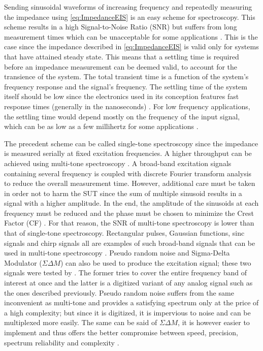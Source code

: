 Sending sinusoidal waveforms of increasing frequency and repeatedly measuring the impedance using \autoref{eq:ImpedanceEIS} is an easy scheme for spectroscopy. This scheme results in a high Signal-to-Noise Ratio (SNR) \cite{leHuy2004circuits} but suffers from long measurement times which can be unacceptable for some applications \cite{Grossi2017,Kargupta2018,Rajabzadeh2019EIS}. This is the case since the impedance described in \ref{eq:ImpedanceEIS} is valid only for systems that have attained steady state. This means that a settling time is required before an impedance measurement can be deemed valid, to account for the transience of the system. The total transient time is a function of the system’s frequency response and the signal’s frequency. The settling time of the system itself should be low since the electronics used in its conception features fast response times (generally in the nanoseconds) \cite{horowitz1989art}. For low frequency applications, the settling time would depend mostly on the frequency of the input signal, which can be as low as a few millihertz for some applications \cite{Grossi2017}. \par

The precedent scheme can be called single-tone spectroscopy since the impedance is measured serially at fixed excitation frequencies. A higher throughput can be achieved using multi-tone spectroscopy \cite{horowitz1989art,Rajabzadeh2019Signals}. A broad-band excitation signals containing several frequency is coupled with discrete Fourier transform analysis to reduce the overall measurement time. However, additional care must be taken in order not to harm the SUT since the sum of multiple sinusoid results in a signal with a higher amplitude. In the end, the amplitude of the sinusoids at each frequency must be reduced and the phase must be chosen to minimize the Crest Factor (CF) \cite{landon1936study}. For that reason, the SNR of multi-tone spectroscopy is lower than that of single-tone spectroscopy. Rectangular pulses, Gaussian functions, sinc signals and chirp signals all are examples of such broad-band signals that can be used in multi-tone spectroscopy \cite{Grossi2017}. Pseudo random noise and Sigma-Delta Modulator ($\Sigma \Delta M$) \cite{reiss2008understanding} can also be used to produce the excitation signal; these two signals were tested by \citep{Rajabzadeh2019Signals}. The former tries to cover the entire frequency band of interest at once and the latter is a digitized variant of any analog signal such as the ones described previously. Pseudo random noise suffers from the same inconvenient as multi-tone and provides a satisfying spectrum only at the price of a high complexity; but since it is digitized, it is impervious to noise and can be multiplexed more easily. The same can be said of $\Sigma \Delta M$, it is however easier to implement and thus offers the better compromise between speed, precision, spectrum reliability and complexity \cite{Rajabzadeh2019Signals}. \par

